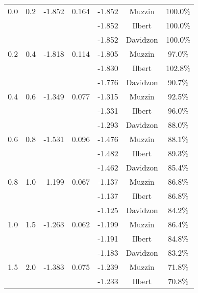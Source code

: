 \begin{table}
\begin{center}
\begin{tabular}{ c c c c c c c }
            0.0 &     0.2 &  -1.852 &   0.164 &  -1.852 &       Muzzin &        100.0\% \\ 
            \multicolumn{4}{c}{}              &  -1.852 &       Ilbert &        100.0\% \\ 
            \multicolumn{4}{c}{}              &  -1.852 &     Davidzon &        100.0\% \\ 
            0.2 &     0.4 &  -1.818 &   0.114 &  -1.805 &       Muzzin &         97.0\% \\ 
            \multicolumn{4}{c}{}              &  -1.830 &       Ilbert &        102.8\% \\ 
            \multicolumn{4}{c}{}              &  -1.776 &     Davidzon &         90.7\% \\ 
            0.4 &     0.6 &  -1.349 &   0.077 &  -1.315 &       Muzzin &         92.5\% \\ 
            \multicolumn{4}{c}{}              &  -1.331 &       Ilbert &         96.0\% \\ 
            \multicolumn{4}{c}{}              &  -1.293 &     Davidzon &         88.0\% \\ 
            0.6 &     0.8 &  -1.531 &   0.096 &  -1.476 &       Muzzin &         88.1\% \\ 
            \multicolumn{4}{c}{}              &  -1.482 &       Ilbert &         89.3\% \\ 
            \multicolumn{4}{c}{}              &  -1.462 &     Davidzon &         85.4\% \\ 
            0.8 &     1.0 &  -1.199 &   0.067 &  -1.137 &       Muzzin &         86.8\% \\ 
            \multicolumn{4}{c}{}              &  -1.137 &       Ilbert &         86.8\% \\ 
            \multicolumn{4}{c}{}              &  -1.125 &     Davidzon &         84.2\% \\ 
            1.0 &     1.5 &  -1.263 &   0.062 &  -1.199 &       Muzzin &         86.4\% \\ 
            \multicolumn{4}{c}{}              &  -1.191 &       Ilbert &         84.8\% \\ 
            \multicolumn{4}{c}{}              &  -1.183 &     Davidzon &         83.2\% \\ 
            1.5 &     2.0 &  -1.383 &   0.075 &  -1.239 &       Muzzin &         71.8\% \\ 
            \multicolumn{4}{c}{}              &  -1.233 &       Ilbert &         70.8\% \\ 

\end{tabular}
\end{center}
\end{table}
